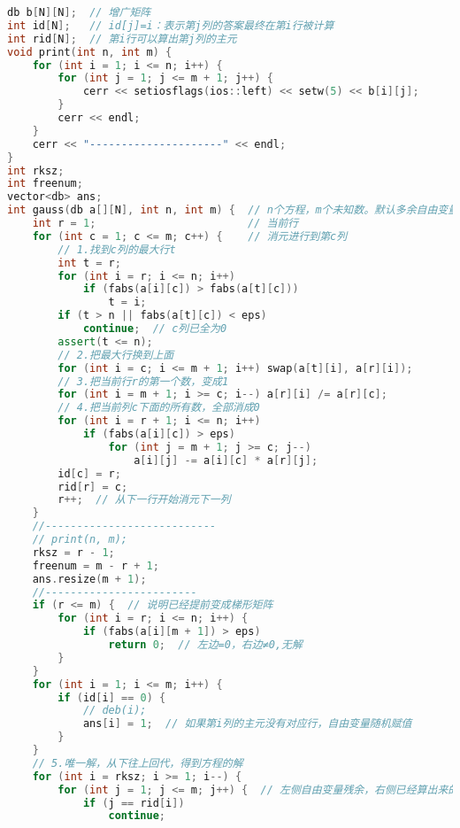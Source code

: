 \begin{lstlisting}[language=C++]
db b[N][N];  // 增广矩阵
int id[N];   // id[j]=i：表示第j列的答案最终在第i行被计算
int rid[N];  // 第i行可以算出第j列的主元
void print(int n, int m) {
    for (int i = 1; i <= n; i++) {
        for (int j = 1; j <= m + 1; j++) {
            cerr << setiosflags(ios::left) << setw(5) << b[i][j];
        }
        cerr << endl;
    }
    cerr << "---------------------" << endl;
}
int rksz;
int freenum;
vector<db> ans;
int gauss(db a[][N], int n, int m) {  // n个方程，m个未知数。默认多余自由变量为0，记录映射关系
    int r = 1;                        // 当前行
    for (int c = 1; c <= m; c++) {    // 消元进行到第c列
        // 1.找到c列的最大行t
        int t = r;
        for (int i = r; i <= n; i++)
            if (fabs(a[i][c]) > fabs(a[t][c]))
                t = i;
        if (t > n || fabs(a[t][c]) < eps)
            continue;  // c列已全为0
        assert(t <= n);
        // 2.把最大行换到上面
        for (int i = c; i <= m + 1; i++) swap(a[t][i], a[r][i]);
        // 3.把当前行r的第一个数，变成1
        for (int i = m + 1; i >= c; i--) a[r][i] /= a[r][c];
        // 4.把当前列c下面的所有数，全部消成0
        for (int i = r + 1; i <= n; i++)
            if (fabs(a[i][c]) > eps)
                for (int j = m + 1; j >= c; j--)
                    a[i][j] -= a[i][c] * a[r][j];
        id[c] = r;
        rid[r] = c;
        r++;  // 从下一行开始消元下一列
    }
    //---------------------------
    // print(n, m);
    rksz = r - 1;
    freenum = m - r + 1;
    ans.resize(m + 1);
    //------------------------
    if (r <= m) {  // 说明已经提前变成梯形矩阵
        for (int i = r; i <= n; i++) {
            if (fabs(a[i][m + 1]) > eps)
                return 0;  // 左边=0，右边≠0,无解
        }
    }
    for (int i = 1; i <= m; i++) {
        if (id[i] == 0) {
            // deb(i);
            ans[i] = 1;  // 如果第i列的主元没有对应行，自由变量随机赋值
        }
    }
    // 5.唯一解，从下往上回代，得到方程的解
    for (int i = rksz; i >= 1; i--) {
        for (int j = 1; j <= m; j++) {  // 左侧自由变量残余，右侧已经算出来的以及右侧自由变量
            if (j == rid[i])
                continue;

\end{lstlisting}
